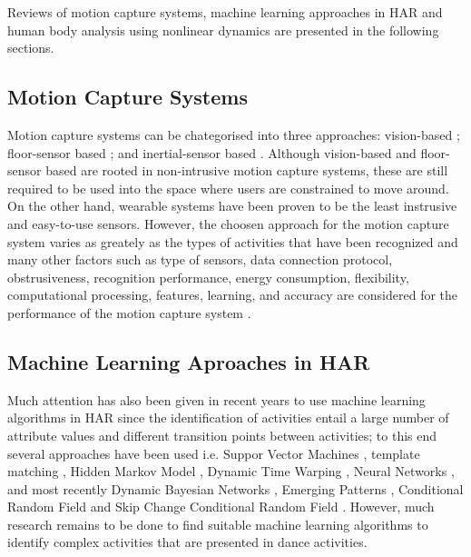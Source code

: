 \documentclass{sigchi}
\begin{document}
Reviews of motion capture systems, 
machine learning approaches in HAR and human body analysis using 
nonlinear dynamics are presented in the following sections.


\subsection{Motion Capture Systems}
Motion capture systems can be chategorised into three approaches: 
vision-based \cite{Forsyth2005}; 
floor-sensor based
\cite{Paradiso1997,Steinhage2008,Aguilar2007,Wimmer2011,Yin2003,Moere2004,
Richardson2004,Srinivasan2005, Rangarajan2008,Visell2010, Rajalingham2010}
; and inertial-sensor based
\cite{Razak2012,Bamberg2008,Benocci2009,Xu2012,Holleczek2010}.
Although vision-based and floor-sensor based are rooted in non-intrusive 
motion capture systems, these are still required to be used into the space 
where users are constrained to move around.
On the other hand, wearable systems have been proven to be the least instrusive 
and easy-to-use sensors. However, the choosen approach for 
the motion capture system varies as greately as the 
types of activities that have been recognized 
and many other factors such as type of sensors, data connection protocol, obstrusiveness, 
recognition performance, energy consumption, flexibility, computational processing,
features, learning, and accuracy 
are considered for the performance of the motion capture system \cite{Lara2013}.

\subsection{Machine Learning Aproaches in HAR}
Much attention has also been given in recent years to use machine learning 
algorithms in HAR since the identification of activities entail a large number of 
attribute values and different transition points between activities;
to this end several approaches have been used i.e. 
Suppor Vector Machines \cite{J.FrankS.Mannor2010, Sama2013, Schuldt2004},
template matching \cite{Nguyen2009,Lin2007}, 
Hidden Markov Model 
\cite{Kohn2012,Niu2004,Chen2003,Bernardin2003,Eickeler1998,Chang2000},
Dynamic Time Warping \cite{Bautista2013,Boulgouris2004,Celebi2011},
Neural Networks \cite{Rosenblum1994,Ji2013,Modi2011,Boesnach2004},
and  most recently Dynamic Bayesian Networks \cite{Cuaya2013, Wang2014}, 
Emerging Patterns \cite{Tao2009, Kim2010},
Conditional Random Field  \cite{Wang2006} and
Skip Change Conditional Random Field \cite{Kim2010}. 
However, much research remains to be done to find suitable machine learning 
algorithms to identify complex activities that are presented in dance activities.
\end{document}
